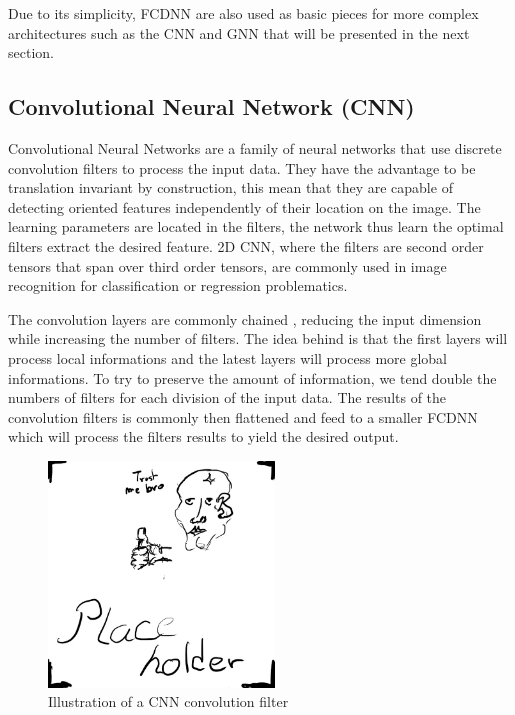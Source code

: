 Due to its simplicity, FCDNN are also used as basic pieces for more complex architectures such as the CNN and GNN that will be presented in the next section.

\subsection{Convolutional Neural Network (CNN)}
\label{ml:cnn}

Convolutional Neural Networks are a family of neural networks that use discrete convolution filters to process the input data. They have the advantage to be translation invariant by construction, this mean that they are capable of detecting oriented features independently of their location on the image. The learning parameters are located in the filters, the network thus learn the optimal filters extract the desired feature. 2D CNN, where the filters are second order tensors that span over third order tensors, are commonly used in image recognition \cite{russakovsky_imagenet_2015} for classification or regression problematics.

The convolution layers are commonly chained \cite{simonyan_very_2015}, reducing the input dimension while increasing the number of filters. The idea behind is that the first layers will process local informations and the latest layers will process more global informations. To try to preserve the amount of information, we tend double the numbers of filters for each division of the input data.
The results of the convolution filters is commonly then flattened and feed to a smaller FCDNN which will process the filters results to yield the desired output.

\begin{figure}[ht]
  \centering
  \includegraphics[height=6cm]{images/placeholder.jpg}
  \caption{Illustration of a CNN convolution filter}
\end{figure}

